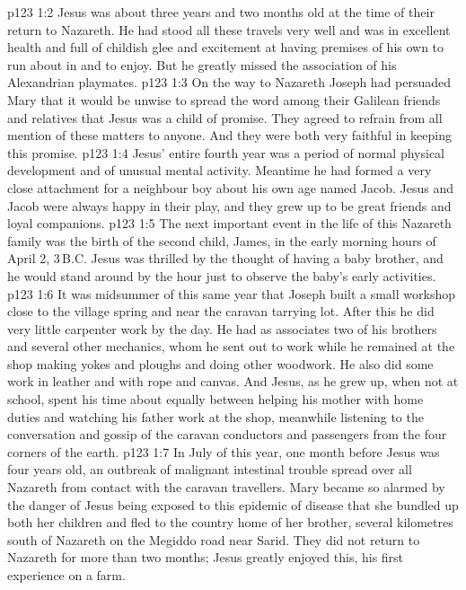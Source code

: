\vs p123 1:2 Jesus was about three years and two months old at the time of their return to Nazareth. He had stood all these travels very well and was in excellent health and full of childish glee and excitement at having premises of his own to run about in and to enjoy. But he greatly missed the association of his Alexandrian playmates.
\vs p123 1:3 On the way to Nazareth Joseph had persuaded Mary that it would be unwise to spread the word among their Galilean friends and relatives that Jesus was a child of promise. They agreed to refrain from all mention of these matters to anyone. And they were both very faithful in keeping this promise.
\vs p123 1:4 Jesus’ entire fourth year was a period of normal physical development and of unusual mental activity. Meantime he had formed a very close attachment for a neighbour boy about his own age named Jacob. Jesus and Jacob were always happy in their play, and they grew up to be great friends and loyal companions.
\vs p123 1:5 The next important event in the life of this Nazareth family was the birth of the second child, James, in the early morning hours of April 2, 3\,B.C. Jesus was thrilled by the thought of having a baby brother, and he would stand around by the hour just to observe the baby’s early activities.
\vs p123 1:6 It was midsummer of this same year that Joseph built a small workshop close to the village spring and near the caravan tarrying lot. After this he did very little carpenter work by the day. He had as associates two of his brothers and several other mechanics, whom he sent out to work while he remained at the shop making yokes and ploughs and doing other woodwork. He also did some work in leather and with rope and canvas. And Jesus, as he grew up, when not at school, spent his time about equally between helping his mother with home duties and watching his father work at the shop, meanwhile listening to the conversation and gossip of the caravan conductors and passengers from the four corners of the earth.
\vs p123 1:7 In July of this year, one month before Jesus was four years old, an outbreak of malignant intestinal trouble spread over all Nazareth from contact with the caravan travellers. Mary became so alarmed by the danger of Jesus being exposed to this epidemic of disease that she bundled up both her children and fled to the country home of her brother, several kilometres south of Nazareth on the Megiddo road near Sarid. They did not return to Nazareth for more than two months; Jesus greatly enjoyed this, his first experience on a farm.
